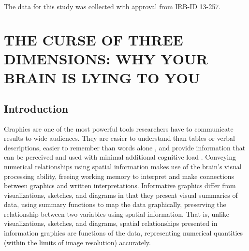 \documentclass[11pt]{isuthesis}\usepackage[]{graphicx}\usepackage[]{color}
\begin{document}
The data for this study was collected with approval from  IRB-ID 13-257.



\graphicspath{{Figure/lieFactorSine/}{Images/lieFactorSine/}}
\renewcommand{\floatpagefraction}{.99}
% 
% 





\chapter{THE CURSE OF THREE DIMENSIONS: WHY YOUR BRAIN IS LYING TO YOU}\label{LieFactorChapter}\label{liefactor}


\section{Introduction}
Graphics are one of the most powerful tools researchers have to communicate results to wide audiences. They are easier to understand than tables or verbal descriptions\citep{larkin1987diagram}, easier to remember than words alone \citep{mayer1994whom}, and provide information that can be perceived and used with minimal additional cognitive load \citep{zhang1994representations}. Conveying numerical relationships using spatial information makes use of the brain's visual processing ability, freeing working memory to interpret and make connections between graphics and written interpretations. Informative graphics differ from visualizations, sketches, and diagrams in that they present visual summaries of data, using summary functions to map the data graphically, preserving the relationship between two variables using spatial information. That is, unlike visualizations, sketches, and diagrams, spatial relationships presented in information graphics are functions of the data, representing numerical quantities (within the limits of image resolution) accurately. 
\end{document}
